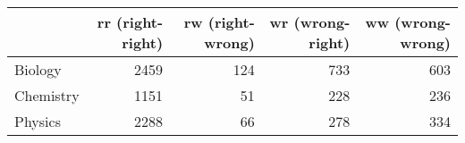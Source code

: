\begin{tabular}{lrrrr}
	\toprule
	{} &    rr (right-right) &   rw (right-wrong) &   wr (wrong-right) &   ww  
	(wrong-wrong) \\
	\midrule
	Biology   &  2459 &  124 &  733 &  603 \\
	Chemistry &  1151 &   51 &  228 &  236 \\
	Physics   &  2288 &   66 &  278 &  334 \\
	\bottomrule
\end{tabular}
